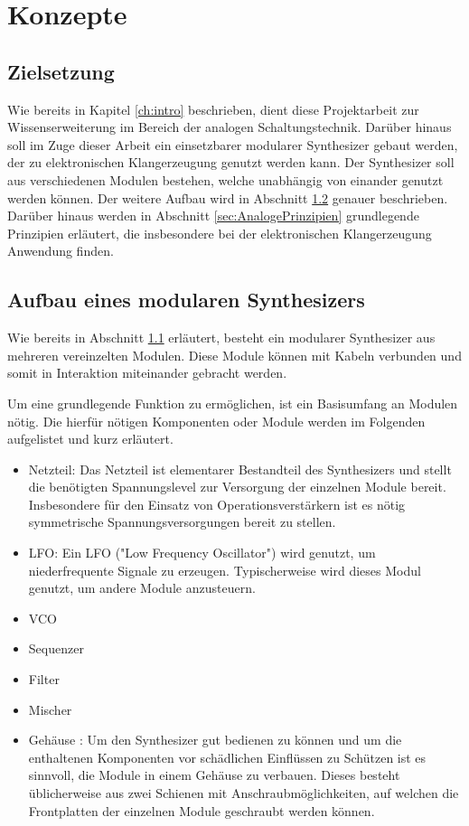 \chapter{Konzepte}
\label{ch:concept}

\section{Zielsetzung}
\label{sec:zielsetzung}
Wie bereits in Kapitel \ref{ch:intro} beschrieben, dient diese Projektarbeit zur Wissenserweiterung im Bereich der analogen Schaltungstechnik.
Darüber hinaus soll im Zuge dieser Arbeit ein einsetzbarer modularer Synthesizer gebaut werden, der zu elektronischen Klangerzeugung genutzt werden kann. 
Der Synthesizer soll aus verschiedenen Modulen bestehen, welche unabhängig von einander genutzt werden können. 
Der weitere Aufbau wird in Abschnitt \ref{sec:AufbauSynth} genauer beschrieben. 
Darüber hinaus werden in Abschnitt \ref{sec:AnalogePrinzipien} grundlegende Prinzipien erläutert, die insbesondere bei der elektronischen Klangerzeugung Anwendung finden.


\section{Aufbau eines modularen Synthesizers}
\label{sec:AufbauSynth}
Wie bereits in Abschnitt \ref{sec:zielsetzung} erläutert, besteht ein modularer Synthesizer aus mehreren vereinzelten Modulen. 
Diese Module können mit Kabeln verbunden und somit in Interaktion miteinander gebracht werden. 

Um eine grundlegende Funktion zu ermöglichen, ist ein Basisumfang an Modulen nötig.
Die hierfür nötigen Komponenten oder Module werden im Folgenden aufgelistet und kurz erläutert.

\begin{itemize}
	\item Netzteil:\newline
	Das Netzteil ist elementarer Bestandteil des Synthesizers und stellt die benötigten Spannungslevel zur Versorgung der einzelnen Module bereit.
	Insbesondere für den Einsatz von Operationsverstärkern ist es nötig symmetrische Spannungsversorgungen bereit zu stellen.
	
	\item LFO: \newline
	Ein LFO ("Low Frequency Oscillator") wird genutzt, um niederfrequente Signale zu erzeugen.
	Typischerweise wird dieses Modul genutzt, um andere Module anzusteuern.
	
	\item VCO
	\item Sequenzer
	\item Filter
	\item Mischer
	\item Gehäuse : \newline
	Um den Synthesizer gut bedienen zu können und um die enthaltenen Komponenten vor schädlichen Einflüssen zu Schützen ist es sinnvoll, 
	die Module in einem Gehäuse zu verbauen. Dieses besteht üblicherweise aus zwei Schienen mit Anschraubmöglichkeiten, 
	auf welchen die Frontplatten der einzelnen Module geschraubt werden können.  
\end{itemize}

